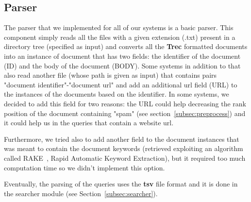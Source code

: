 \subsection{Parser}
\label{subsec:parser}
The parser that we implemented for all of our systems is a basic parser. This component simply reads all the files with a given extension (.txt) present in a directory tree (specified as input) and converts all the \textbf{Trec} formatted documents into an instance of document that has two fields: the identifier of the document (ID) and the body of the document (BODY). Some systems in addition to that also read another file (whose path is given as input) that contains pairs "document identifier"-"document url" and add an additional url field (URL) to the instances of the documents based on the identifier. In some systems, we decided to add this field for two reasons: the URL could help decreasing the rank position of the document containing "spam" (see section~\ref{subsec:preprocess}) and it could help us in the queries that contain a website url.
\par
Furthermore, we tried also to add another field to the document instances that was meant to contain the document keywords (retrieved exploiting an algorithm called RAKE~\cite{rake}, Rapid Automatic Keyword Extraction), but it required too much computation time so we didn't implement this option.
\par
Eventually, the parsing of the queries uses the \textbf{tsv} file format and it is done in the searcher module (see Section~\ref{subsec:searcher}).


